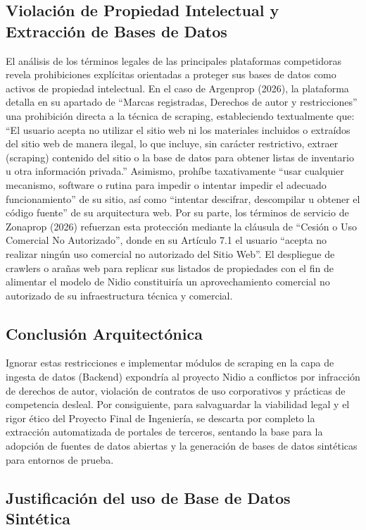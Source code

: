 \subsection{Violación de Propiedad Intelectual y Extracción de Bases de Datos}

El análisis de los términos legales de las principales plataformas competidoras revela prohibiciones explícitas orientadas a proteger sus bases de datos como activos de propiedad intelectual. En el caso de Argenprop (2026), la plataforma detalla en su apartado de ``Marcas registradas, Derechos de autor y restricciones'' una prohibición directa a la técnica de scraping, estableciendo textualmente que: ``El usuario acepta no utilizar el sitio web ni los materiales incluidos o extraídos del sitio web de manera ilegal, lo que incluye, sin carácter restrictivo, extraer (scraping) contenido del sitio o la base de datos para obtener listas de inventario u otra información privada.'' Asimismo, prohíbe taxativamente ``usar cualquier mecanismo, software o rutina para impedir o intentar impedir el adecuado funcionamiento'' de su sitio, así como ``intentar descifrar, descompilar u obtener el código fuente'' de su arquitectura web. Por su parte, los términos de servicio de Zonaprop (2026) refuerzan esta protección mediante la cláusula de ``Cesión o Uso Comercial No Autorizado'', donde en su Artículo 7.1 el usuario ``acepta no realizar ningún uso comercial no autorizado del Sitio Web''. El despliegue de crawlers o arañas web para replicar sus listados de propiedades con el fin de alimentar el modelo de Nidio constituiría un aprovechamiento comercial no autorizado de su infraestructura técnica y comercial.

\subsection{Conclusión Arquitectónica}

Ignorar estas restricciones e implementar módulos de scraping en la capa de ingesta de datos (Backend) expondría al proyecto Nidio a conflictos por infracción de derechos de autor, violación de contratos de uso corporativos y prácticas de competencia desleal. Por consiguiente, para salvaguardar la viabilidad legal y el rigor ético del Proyecto Final de Ingeniería, se descarta por completo la extracción automatizada de portales de terceros, sentando la base para la adopción de fuentes de datos abiertas y la generación de bases de datos sintéticas para entornos de prueba.

\subsection{Justificación del uso de Base de Datos Sintética}

